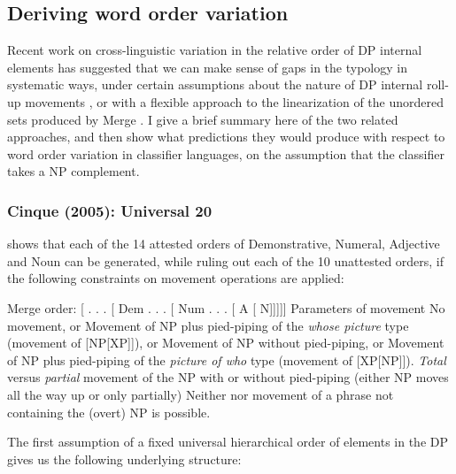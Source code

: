 \documentclass[output=paper
,modfonts
,nonflat]{langsci/langscibook}
\begin{document}
\subsection{Deriving word order variation}

Recent work on cross-linguistic variation in the relative order of DP internal elements has suggested that we can make sense of gaps in the typology in systematic ways, under certain assumptions about the nature of DP internal roll-up movements \citep{Cinque1996,Cinque2005}, or with a flexible approach to the linearization of the unordered sets produced by Merge \citep{AbelsNeeleman2012}. I give a brief summary here of the two related approaches, and then show what predictions they would produce with respect to word order variation in classifier languages, on the assumption that the classifier takes a NP complement. 

\subsubsection{Cinque (2005): Universal 20}
\citet{Cinque2005} shows that each of the 14 attested orders of Demonstrative, Numeral, Adjective and Noun can be generated, while ruling out each of the 10 unattested orders, if the following constraints on movement operations are applied:

\ea \label{ex:hall:55}
\ea Merge order: [ . . . [ Dem . . . [ Num . . . [ A [ N]]]]]
\ex Parameters of movement
\ea No movement, or
\ex Movement of NP plus pied-piping of the \textit{whose picture} type (movement of [NP[XP]]), or  \label{ex:hall:55bii}
\ex Movement of NP without pied-piping, or \label{ex:hall:55biii}
\ex Movement of NP plus pied-piping of the \textit{picture of who} type (movement of [XP[NP]]). \label{ex:hall:55biv}
\ex \textit{Total} versus \textit{partial} movement of the NP with or without pied-piping (either NP moves all the way up or only partially)
\ex Neither  nor movement of a phrase not containing the (overt) NP is possible.
\z
\z
\z

The first assumption of a fixed universal hierarchical order of elements in the DP gives us the following underlying structure:

\ea \label{ex:hall:56} %
\end{document}
